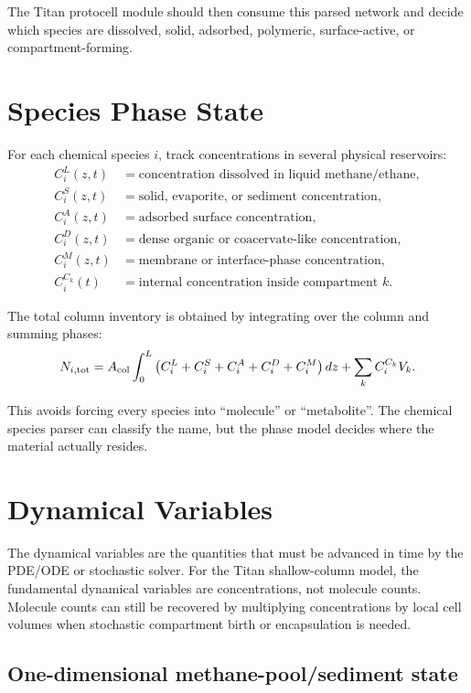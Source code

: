 \documentclass[11pt]{article}
\begin{document}
The Titan protocell module should then consume this parsed network and decide which species are dissolved, solid, adsorbed, polymeric, surface-active, or compartment-forming.

\section{Species Phase State}

For each chemical species $i$, track concentrations in several physical reservoirs:
\begin{align}
C_i^L(z,t) &= \text{concentration dissolved in liquid methane/ethane},\\
C_i^S(z,t) &= \text{solid, evaporite, or sediment concentration},\\
C_i^A(z,t) &= \text{adsorbed surface concentration},\\
C_i^D(z,t) &= \text{dense organic or coacervate-like concentration},\\
C_i^M(z,t) &= \text{membrane or interface-phase concentration},\\
C_i^{C_k}(t) &= \text{internal concentration inside compartment } k.
\end{align}

The total column inventory is obtained by integrating over the column and summing phases:
\begin{equation}
N_{i,\rm tot}
=
A_{\rm col}
\int_0^L
\left(
C_i^L+C_i^S+C_i^A+C_i^D+C_i^M
\right)dz
+
\sum_k C_i^{C_k}V_k.
\end{equation}

This avoids forcing every species into ``molecule'' or ``metabolite''. The chemical species parser can classify the name, but the phase model decides where the material actually resides.

\section{Dynamical Variables}

The dynamical variables are the quantities that must be advanced in time by the PDE/ODE or stochastic solver. For the Titan shallow-column model, the fundamental dynamical variables are concentrations, not molecule counts. Molecule counts can still be recovered by multiplying concentrations by local cell volumes when stochastic compartment birth or encapsulation is needed.

\subsection{One-dimensional methane-pool/sediment state}
\end{document}
